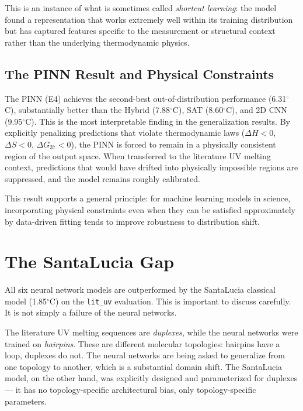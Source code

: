 \documentclass[12pt,oneside,letterpaper]{report}
\begin{document}
This is an instance of what is sometimes called \textit{shortcut learning}: the model found a representation that works extremely well within its training distribution but has captured features specific to the measurement or structural context rather than the underlying thermodynamic physics.

\subsection{The PINN Result and Physical Constraints}

The PINN (E4) achieves the second-best out-of-distribution performance (6.31$^\circ$C), substantially better than the Hybrid (7.88$^\circ$C), SAT (8.60$^\circ$C), and 2D CNN (9.95$^\circ$C). This is the most interpretable finding in the generalization results. By explicitly penalizing predictions that violate thermodynamic laws ($\Delta H < 0$, $\Delta S < 0$, $\Delta G_{37} < 0$), the PINN is forced to remain in a physically consistent region of the output space. When transferred to the literature UV melting context, predictions that would have drifted into physically impossible regions are suppressed, and the model remains roughly calibrated.

This result supports a general principle: for machine learning models in science, incorporating physical constraints even when they can be satisfied approximately by data-driven fitting tends to improve robustness to distribution shift.

\section{The SantaLucia Gap}

All six neural network models are outperformed by the SantaLucia classical model (1.85$^\circ$C) on the \texttt{lit\_uv} evaluation. This is important to discuss carefully. It is not simply a failure of the neural networks.

The literature UV melting sequences are \textit{duplexes}, while the neural networks were trained on \textit{hairpins}. These are different molecular topologies: hairpins have a loop, duplexes do not. The neural networks are being asked to generalize from one topology to another, which is a substantial domain shift. The SantaLucia model, on the other hand, was explicitly designed and parameterized for duplexes --- it has no topology-specific architectural bias, only topology-specific parameters.
\end{document}
